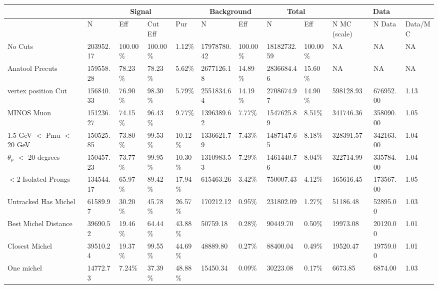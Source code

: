 \begin{table}
    \tiny
    \centering
    \begin{tabular}{|*{12}{l|}}


    \hline
    & \multicolumn{4}{c|}{Signal} & \multicolumn{2}{c|}{Background} & \multicolumn{2}{c|}{Total} & \multicolumn{3}{c|}{Data} \\
    \hline
& N     & Eff     & Cut Eff & Pur    & N         & Eff     & N         & Eff     & N MC (scale) & N Data    & Data/MC \\\hline
 No Cuts   & 203952.17     & 100.00\% & 100.00\% &   1.12\% & 17978780.42 & 100.00\% & 18182732.59 & 100.00\% & NA & NA & NA \\ \hline
 Anatool Precuts   & 159558.28     &  78.23\% &  78.23\% &   5.62\% & 2677126.18 &  14.89\% & 2836684.46 &  15.60\% & NA & NA & NA \\ \hline
 vertex position Cut   & 156840.33     &  76.90\% &  98.30\% &   5.79\% & 2551834.64 &  14.19\% & 2708674.97     &  14.90\% & 598128.93     & 676952.00 &   1.13 \\ \hline
 MINOS Muon   & 151236.27     &  74.15\% &  96.43\% &   9.77\% & 1396389.62 &   7.77\% & 1547625.89     &   8.51\% & 341746.36     & 358090.00 &   1.05 \\ \hline
 1.5 GeV $<$ Pmu $<$ 20 GeV   & 150525.85     &  73.80\% &  99.53\% &  10.12\% & 1336621.79 &   7.43\% & 1487147.65     &   8.18\% & 328391.57     & 342163.00 &   1.04 \\ \hline
 $\theta_{\mu}$ $<$ 20 degrees   & 150457.23     &  73.77\% &  99.95\% &  10.30\% & 1310983.53 &   7.29\% & 1461440.76     &   8.04\% & 322714.99     & 335784.00 &   1.04 \\ \hline
 $<$2 Isolated Prongs   & 134544.17     &  65.97\% &  89.42\% &  17.94\% & 615463.26 &   3.42\% & 750007.43     &   4.12\% & 165616.45     & 173567.00 &   1.05 \\ \hline
 Untracked Has Michel   & 61589.97     &  30.20\% &  45.78\% &  26.57\% & 170212.12 &   0.95\% & 231802.09     &   1.27\% & 51186.48     & 52895.00 &   1.03 \\ \hline
 Best Michel Distance   & 39690.52     &  19.46\% &  64.44\% &  43.88\% & 50759.18 &   0.28\% & 90449.70     &   0.50\% & 19973.08     & 20120.00 &   1.01 \\ \hline
 Closest Michel   & 39510.24     &  19.37\% &  99.55\% &  44.69\% & 48889.80 &   0.27\% & 88400.04     &   0.49\% & 19520.47     & 19759.00 &   1.01 \\ \hline
 One michel   & 14772.73     &   7.24\% &  37.39\% &  48.88\% & 15450.34 &   0.09\% & 30223.08     &   0.17\% & 6673.85     & 6874.00 &   1.03 \\ \hline

\end{tabular}
\end{table}
